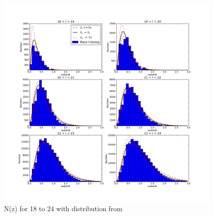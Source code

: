 \documentclass[]{article}
\begin{document}
\begin{figure}
\centering
\includegraphics[width=5in]{validation_figures/Nofz_18_24.png}
\caption{N(z) for 18 to 24 with distribution from \cite{coil}\label{fig:nofz18_24}}
\end{figure}
\end{document}
